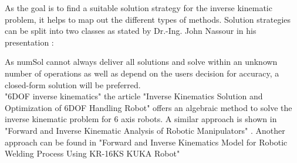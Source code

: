 As the goal is to find a suitable solution strategy for the inverse kinematic problem, it helps to map out the different types of methods.
Solution strategies can be split into two classes as stated by Dr.-Ing. John Nassour in his presentation \cite{invKinSeriallinkMani}:\\
\medskip


\medskip

As 
\gls{numSol} 
cannot always deliver all solutions and solve within an unknown number of operations as well as depend on the users decision for accuracy, \cite{invKinSeriallinkMani} a closed-form solution will be preferred.\\

"6DOF inverse kinematics" the article "Inverse Kinematics Solution and Optimization of 6DOF Handling Robot" \cite{invKinSolYanWu} 
offers an  algebraic method to solve the inverse kinematic problem for 6 axis robots.
A similar approach is shown in "Forward and Inverse Kinematic Analysis of Robotic Manipulators" \cite{FwdInvAnalysRobManip}. Another approach can be found in "Forward and Inverse Kinematics Model for Robotic Welding Process Using KR-16KS KUKA Robot" \cite{FwInvKuka} \\

